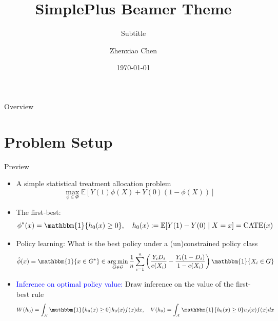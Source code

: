 \documentclass[aspectratio=169,xcolor=dvipsnames]{beamer}
\title{SimplePlus Beamer Theme}
\subtitle{Subtitle}
\author{Zhenxiao Chen}
\institute
{
    Department of Economics \\
    University of Pennsylvania %
}
\date{\today} %
\DeclareMathOperator*{\argmin}{arg\,min}
\begin{document}
\begin{frame}
    \titlepage
\end{frame}

\begin{frame}{Overview}
    \tableofcontents
\end{frame}

\section{Problem Setup}
\begin{frame}{Preview}
    \begin{itemize}
        \item A simple statistical treatment allocation problem 
            \[
                \max_{\phi \in \Phi}
                \mathbb{E}\left[
                Y(1)\phi(X) + Y(0)(1- \phi(X))
                \right]
            \]
        \item The first-best:
            \[
                \phi^*(x) = \mathbbm{1}\{h_0(x) \geq 0\}, \quad h_0(x) := \mathbb{E}[Y(1) -Y(0) \mid X=x] = \text{CATE}(x)
            \]
        \item Policy learning: What is the best policy under a (un)constrained policy class
            \[
            \hat{\phi}(x) = \mathbbm{1}\{x\in G^*\} \in \argmin_{G \in \mathcal{G}} \frac{1}{n}\sum_{i=1}^n\left(\frac{Y_i D_i}{e(X_i)} - \frac{Y_i(1-D_i)}{1-e(X_i)}\right)\mathbbm{1}\{X_i \in G\}
            \]

        \item \textcolor{blue}{Inference on optimal policy value:} Draw inference on the value of the first-best rule
            \[
            W(h_0) = \int_\mathcal{X}\mathbbm{1}\{h_0(x) \geq 0\}h_0(x)f(x)dx, \quad V(h_0) = \int_\mathcal{X}\mathbbm{1}\{h_0(x) \geq 0\}v_0(x)f(x)dx
            \]
    \end{itemize}
\end{frame}
\end{document}
